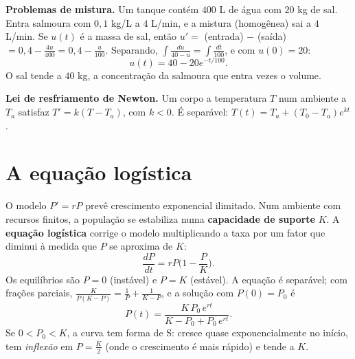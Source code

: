 \textbf{Problemas de mistura.} Um tanque contém $400$ L de água com $20$ kg de sal. Entra
salmoura com $0{,}1$ kg/L a $4$ L/min, e a mistura (homogênea) sai a $4$ L/min. Se $u(t)$ é a
massa de sal, então $u'=$ (entrada) $-$ (saída) $=0{,}4-\frac{4u}{400}=0{,}4-\frac u{100}$.
Separando, $\int\frac{du}{40-u}=\int\frac{dt}{100}$, e com $u(0)=20$:
\[
u(t)=40-20e^{-t/100}.
\]
O sal tende a $40$ kg, a concentração da salmoura que entra vezes o volume.

\textbf{Lei de resfriamento de Newton.} Um corpo a temperatura
$T$ num ambiente a $T_a$ satisfaz $T'=k(T-T_a)$, com $k<0$. É separável:
$T(t)=T_a+(T_0-T_a)e^{kt}$.

\section{A equação logística}

O modelo $P'=rP$ prevê crescimento exponencial ilimitado. Num ambiente com recursos finitos, a
população se estabiliza numa \textbf{capacidade de suporte} $K$.
A \textbf{equação logística} corrige o modelo multiplicando a taxa
por um fator que diminui à medida que $P$ se aproxima de $K$:
\[
\frac{dP}{dt}=rP\Big(1-\frac PK\Big).
\]
Os equilíbrios são $P=0$ (instável) e $P=K$ (estável). A equação é separável; com frações
parciais, $\frac{K}{P(K-P)}=\frac1P+\frac1{K-P}$, e a solução com $P(0)=P_0$ é
\[
P(t)=\frac{K\,P_0\,e^{rt}}{K-P_0+P_0\,e^{rt}} .
\]
Se $0<P_0<K$, a curva tem forma de S: cresce quase exponencialmente no início, tem
\emph{inflexão} em $P=\frac K2$ (onde o crescimento é mais rápido) e tende a $K$.


